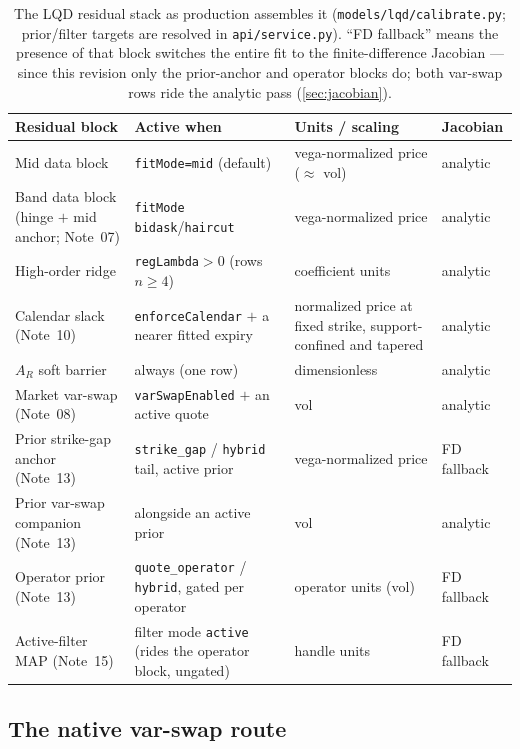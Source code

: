 \documentclass[11pt]{article}
\begin{document}
\begin{table}[H]
\centering\small
\setlength{\tabcolsep}{4pt}
\begin{tabular}{@{}p{}p{}p{}l@{}}
\toprule
Residual block & Active when & Units / scaling & Jacobian\\
\midrule
Mid data block & \texttt{fitMode=mid} (default) & vega-normalized price
($\approx$ vol) & analytic\\
Band data block (hinge $+$ mid anchor; Note~07) & \texttt{fitMode}
\texttt{bidask}/\texttt{haircut} & vega-normalized price & analytic\\
High-order ridge & \texttt{regLambda}$>0$ (rows $n\ge4$) & coefficient units &
analytic\\
Calendar slack (Note~10) & \texttt{enforceCalendar} $+$ a nearer fitted expiry
& normalized price at fixed strike, support-confined and tapered & analytic\\
$A_R$ soft barrier & always (one row) & dimensionless & analytic\\
\midrule
Market var-swap (Note~08) & \texttt{varSwapEnabled} $+$ an active quote &
vol & analytic\\
Prior strike-gap anchor (Note~13) & \texttt{strike\_gap} / \texttt{hybrid}
tail, active prior & vega-normalized price & FD fallback\\
Prior var-swap companion (Note~13) & alongside an active prior & vol &
analytic\\
Operator prior (Note~13) & \texttt{quote\_operator} / \texttt{hybrid}, gated
per operator & operator units (vol) & FD fallback\\
Active-filter MAP (Note~15) & filter mode \texttt{active} (rides the operator
block, ungated) & handle units & FD fallback\\
\bottomrule
\end{tabular}
\caption{The LQD residual stack as production assembles it
(\texttt{models/lqd/calibrate.py}; prior/filter targets are resolved in
\texttt{api/service.py}).  ``FD fallback'' means the presence of that block
switches the entire fit to the finite-difference Jacobian --- since this
revision only the prior-anchor and operator blocks do; both var-swap rows
ride the analytic pass (\cref{sec:jacobian}).}
\label{tab:stack}
\end{table}

\subsection{The native var-swap route}
\label{sec:varswap}
\end{document}
